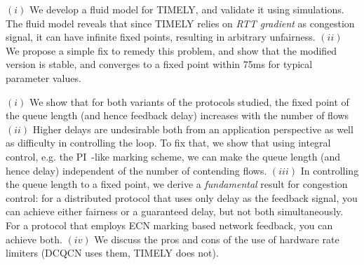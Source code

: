  $(i)$ We develop a fluid model for TIMELY, and validate it using
simulations. The fluid model reveals that since TIMELY relies on {\em RTT
gradient} as congestion signal, it can have infinite fixed points, resulting in
arbitrary unfairness.  $(ii)$ We propose a simple fix to remedy this problem,
and show that the modified version is stable, and converges to a fixed point
within 75ms for typical parameter values.

 $(i)$ We show that for both variants of the protocols
studied, the fixed point of the queue length (and hence feedback delay)
increases with the number of flows $(ii)$ Higher delays are undesirable both
from an application perspective as well as difficulty in controlling the loop.
To fix that, we show that using integral control, e.g. the
PI~\cite{Hollot:PIController}-like marking scheme, we can make the queue length
(and hence delay) independent of the number of contending flows. $(iii)$ In
controlling the queue length to a fixed point, we derive a \emph{fundamental}
result for congestion control: for a distributed protocol that uses only delay
as the feedback signal, you can achieve either fairness or a guaranteed delay,
but not both simultaneously. For a protocol that employs ECN marking based
network feedback, you can achieve both. $(iv)$ We discuss the pros and cons of
the use of hardware rate limiters (DCQCN uses them, TIMELY does not).


